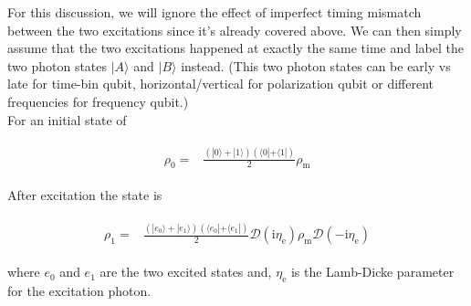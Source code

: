 \documentclass[10pt,fleqn]{article}
\newcommand{\ui}{\mathrm{i}}
\newcommand{\eqar}[1]
{
  \begin{align}
    #1
  \end{align}
}
\newcommand{\paren}[1]{{\left({#1}\right)}}
\begin{document}
For this discussion, we will ignore the effect of imperfect timing mismatch between
the two excitations since it's already covered above. We can then simply assume
that the two excitations happened at exactly the same time and label the two photon
states $|A\rangle$ and $|B\rangle$ instead. (This two photon states can be
early vs late for time-bin qubit, horizontal/vertical for polarization qubit
or different frequencies for frequency qubit.)\\

For an initial state of
\eqar{
  \begin{split}
    \rho_0=&\frac{\paren{|0\rangle+|1\rangle}\paren{\langle0|+\langle1|}}{2}\rho_{\mathrm{m}}
  \end{split}
}
After excitation the state is
\eqar{
  \begin{split}
    \rho_1=&\frac{\paren{|e_0\rangle+|e_1\rangle}\paren{\langle e_0|+\langle e_1|}}{2}\mathcal{D}(\ui\eta_{\mathrm{e}})\rho_{\mathrm{m}}\mathcal{D}(-\ui\eta_{\mathrm{e}})
  \end{split}
}
where $e_0$ and $e_1$ are the two excited states and,
$\eta_{\mathrm{e}}$ is the Lamb-Dicke parameter for the excitation photon.\\
\end{document}

